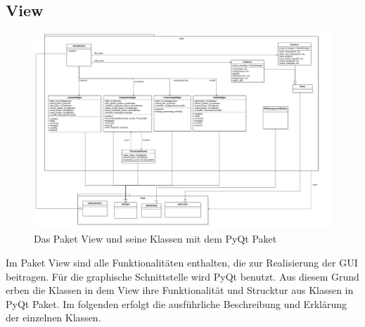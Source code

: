 \documentclass{article}
\begin{document}
\subsection{View}
\begin{figure}[H]%
    \centering
    \includegraphics[width=15cm]{entwurf/Entwurf_dokument/img/Alissa/View.png}
    \caption{Das Paket View und seine Klassen mit dem PyQt Paket}
\end{figure}
Im Paket View sind alle Funktionalitäten enthalten, die zur Realisierung der GUI beitragen. Für die graphische Schnittstelle wird PyQt benutzt. Aus diesem Grund erben die Klassen in dem View ihre Funktionalität und Strucktur aus Klassen in PyQt Paket. Im folgenden erfolgt die ausführliche Beschreibung und Erklärung der einzelnen Klassen.
\end{document}
